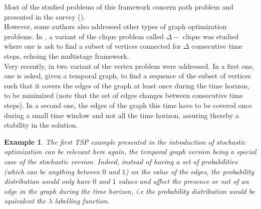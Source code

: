 \documentclass[a4paper]{book}
\newtheorem{ex}{Example}[chapter]
\begin{document}
Most of the studied problems of this framework concern path problem and presented in the survey (\cite{Michail16}).\\
However, some authors also addressed other types of graph optimization problems.
In \cite{himmel2017adapting}, a variant of the {\sc clique} problem called {\sc $\Delta-$ clique} was studied where one is ask to find a subset of vertices connected for $\Delta$ consecutive time steps, echoing the multistage framework. \\
Very recently, in \cite{AkridaMSZ20} two variant of the {\sc vertex problem} were addressed. In a first one, one is asked, given a temporal graph, to find a sequence of the subset of vertices such that it covers the edges of the graph at least once during the time horizon, to be minimized (note that the set of edges changes between consecutive time steps). In a second one, the edges of the graph this time have to be covered once during a small time window and not all the time horizon, assuring thereby a stability in the solution.

\begin{ex}
The first {\sc TSP} example presented in the introduction of stochastic optimization can be relevant here again, the temporal graph version being a special case of the stochastic version. Indeed, instead of having a set of probabilities (which can be anything between $0$ and $1$) on the value of the edges, the probability distribution would only have $0$ and $1$ values and affect the presence or not of an edge in the graph during the time horizon, i.e the probability distribution would be equivalent the $\lambda $ labelling function. 
\end{ex}
\end{document}
